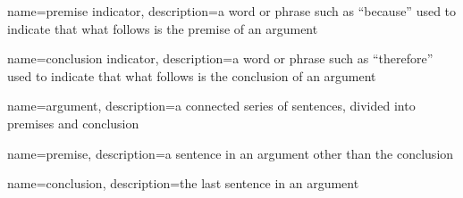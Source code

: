 
%





{
name=premise indicator,
description={a word or phrase such as ``because'' used to indicate that what follows is the premise of an argument}
}

{
name=conclusion indicator,
description={a word or phrase such as ``therefore'' used to indicate that what follows is the conclusion of an argument}
}

{
name=argument,
description={a connected series of sentences, divided into \gls{premise}s and \gls{conclusion}}
}

{
name=premise,
description={a sentence in an \gls{argument} other than the \gls{conclusion}}
}

{
name=conclusion,
description={the last sentence in an \gls{argument}}
}






